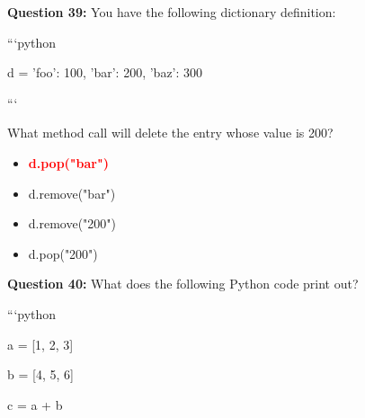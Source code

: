 \documentclass[12pt,a4paper]{article}
\begin{document}
\vspace{0.5cm}

\textbf{Question 39:} You have the following dictionary definition:\newline

\newline
\newline

\newline
```python\newline

\newline
d = 'foo': 100, 'bar': 200, 'baz': 300\newline

\newline
```\newline

\newline
\newline

\newline
What method call will delete the entry whose value is 200?

\begin{itemize}
    \item[\textbf{A.}] \textcolor{red}{\textbf{d.pop("bar")}}
    \item[\textbf{B.}] d.remove("bar")
    \item[\textbf{C.}] d.remove("200")
    \item[\textbf{D.}] d.pop("200")
\end{itemize}

\vspace{0.5cm}

\textbf{Question 40:} What does the following Python code print out?\newline

\newline
\newline

\newline
```python\newline

\newline
a = [1, 2, 3]\newline

\newline
b = [4, 5, 6]\newline

\newline
c = a + b\newline
\end{document}
